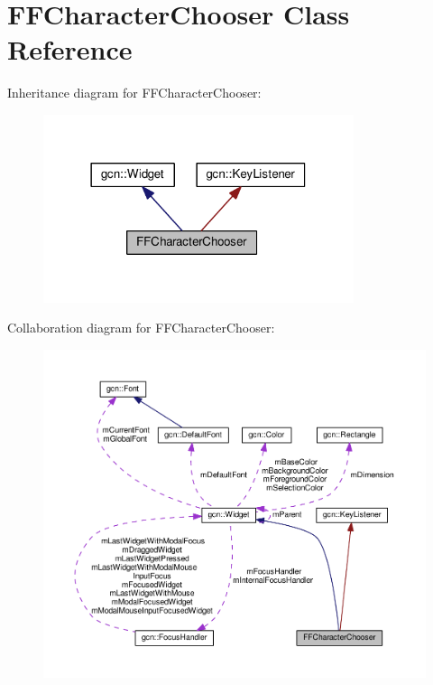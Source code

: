 \hypertarget{classFFCharacterChooser}{}\section{F\+F\+Character\+Chooser Class Reference}
\label{classFFCharacterChooser}


Inheritance diagram for F\+F\+Character\+Chooser\+:\nopagebreak
\begin{figure}[H]
\begin{center}
\leavevmode
\includegraphics[width=258pt]{classFFCharacterChooser__inherit__graph}
\end{center}
\end{figure}


Collaboration diagram for F\+F\+Character\+Chooser\+:\nopagebreak
\begin{figure}[H]
\begin{center}
\leavevmode
\includegraphics[width=350pt]{classFFCharacterChooser__coll__graph}
\end{center}
\end{figure}
